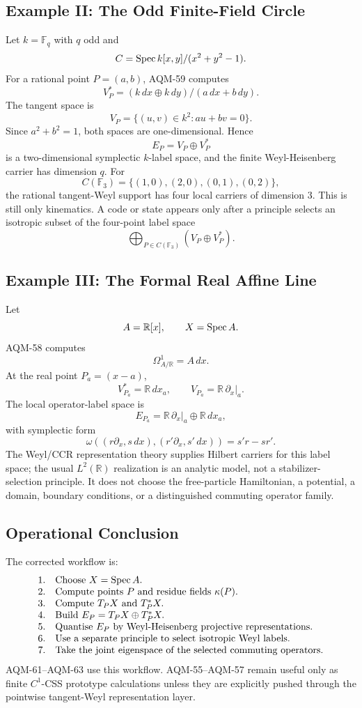 \subsection{Example II: The Odd Finite-Field Circle}

Let \(k=\mathbb F_q\) with \(q\) odd and
\[
  C=\operatorname{Spec} k[x,y]/(x^2+y^2-1).
\]
For a rational point \(P=(a,b)\), AQM-59 computes
\[
  V_P^*=(k\,dx\oplus k\,dy)/(a\,dx+b\,dy).
\]
The tangent space is
\[
  V_P=\{(u,v)\in k^2:au+bv=0\}.
\]
Since \(a^2+b^2=1\), both spaces are one-dimensional.  Hence
\[
  E_P=V_P\oplus V_P^*
\]
is a two-dimensional symplectic \(k\)-label space, and the finite
Weyl-Heisenberg carrier has dimension \(q\).  For
\[
  C(\mathbb F_3)=\{(1,0),(2,0),(0,1),(0,2)\},
\]
the rational tangent-Weyl support has four local carriers of dimension \(3\).
This is still only kinematics.  A code or state appears only after a principle
selects an isotropic subset of the four-point label space
\[
  \bigoplus_{P\in C(\mathbb F_3)}(V_P\oplus V_P^*).
\]

\subsection{Example III: The Formal Real Affine Line}

Let
\[
  A=\mathbb R[x],\qquad X=\operatorname{Spec} A.
\]
AQM-58 computes
\[
  \Omega^1_{A/\mathbb R}=A\,dx.
\]
At the real point \(P_a=(x-a)\),
\[
  V_{P_a}^*=\mathbb R\,dx_a,\qquad
  V_{P_a}=\mathbb R\,\partial_x|_a .
\]
The local operator-label space is
\[
  E_{P_a}=\mathbb R\,\partial_x|_a\oplus\mathbb R\,dx_a,
\]
with symplectic form
\[
  \omega((r\partial_x,s\,dx),(r'\partial_x,s'\,dx))=s'r-sr'.
\]
The Weyl/CCR representation theory supplies Hilbert carriers for this label
space; the usual \(L^2(\mathbb R)\) realization is an analytic model, not a
stabilizer-selection principle.  It does not choose the free-particle
Hamiltonian, a potential, a domain, boundary conditions, or a distinguished
commuting operator family.

\subsection{Operational Conclusion}

The corrected workflow is:
\[
\begin{array}{ll}
1. & \text{Choose }X=\operatorname{Spec} A.\\
2. & \text{Compute points }P\text{ and residue fields }\kappa(P).\\
3. & \text{Compute }T_PX\text{ and }T_P^*X.\\
4. & \text{Build }E_P=T_PX\oplus T_P^*X.\\
5. & \text{Quantise }E_P\text{ by Weyl-Heisenberg projective representations}.\\
6. & \text{Use a separate principle to select isotropic Weyl labels}.\\
7. & \text{Take the joint eigenspace of the selected commuting operators}.
\end{array}
\]
AQM-61--AQM-63 use this workflow.  AQM-55--AQM-57 remain useful only as
finite \(C^1\)-CSS prototype calculations unless they are explicitly pushed
through the pointwise tangent-Weyl representation layer.
